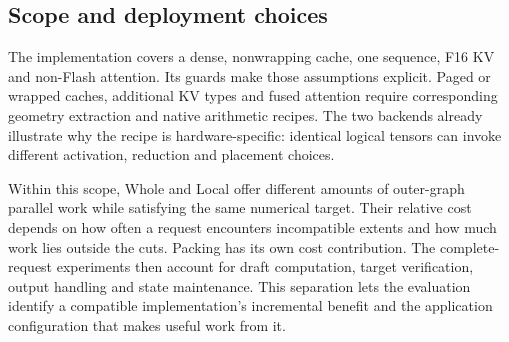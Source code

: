 \subsection{Scope and deployment choices}
The implementation covers a dense, nonwrapping cache, one sequence, F16 KV and non-Flash attention. Its guards make those assumptions explicit. Paged or wrapped caches, additional KV types and fused attention require corresponding geometry extraction and native arithmetic recipes. The two backends already illustrate why the recipe is hardware-specific: identical logical tensors can invoke different activation, reduction and placement choices.

Within this scope, Whole and Local offer different amounts of outer-graph parallel work while satisfying the same numerical target. Their relative cost depends on how often a request encounters incompatible extents and how much work lies outside the cuts. Packing has its own cost contribution. The complete-request experiments then account for draft computation, target verification, output handling and state maintenance. This separation lets the evaluation identify a compatible implementation's incremental benefit and the application configuration that makes useful work from it.
